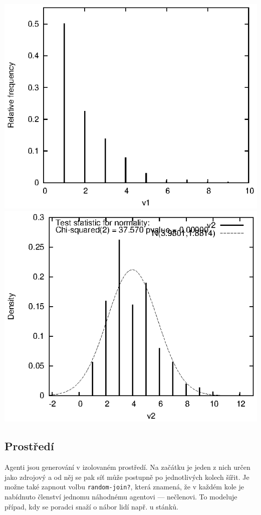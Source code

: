 \documentclass[a4wide,12pt]{report}
\begin{document}
\begin{center}\includegraphics{hist_fr_v1.eps}\includegraphics{hist_fr_v2.eps}\end{center}
\subsection{Prostředí}
Agenti jsou generování v izolovaném prostředí. Na začátku je jeden z nich určen jako zdrojový a od něj se pak síť může postupně po jednotlivých kolech šířit. Je možne také zapnout volbu \texttt{random-join?}, která znamená, že v každém kole je nabídnuto členství jednomu náhodnému agentovi --- nečlenovi. To modeluje případ, kdy se poradci snaží o nábor lidí např. u stánků.
\end{document}
